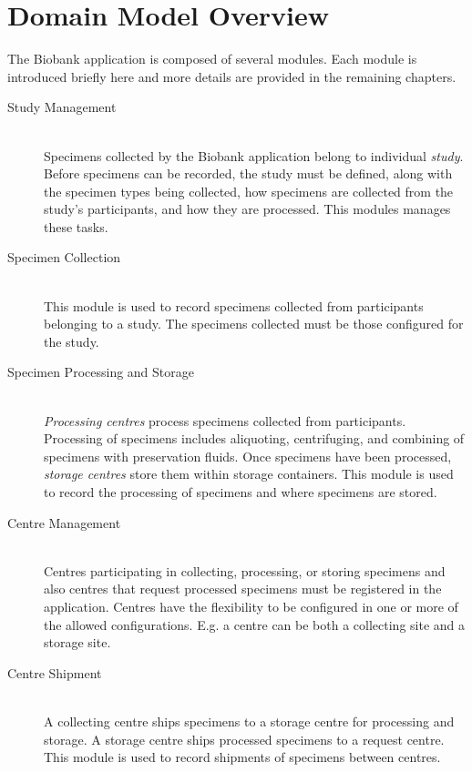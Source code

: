 \chapter{Domain Model Overview}

The Biobank application is composed of several modules. Each module is
introduced briefly here and more details are provided in the remaining
chapters.

\begin{description}

\item[Study Management] \hfill \\ Specimens collected by the Biobank
  application belong to individual \emph{study}. Before specimens can be
  recorded, the study must be defined, along with the specimen types being
  collected, how specimens are collected from the study's participants, and how
  they are processed. This modules manages these tasks.

\item[Specimen Collection] \hfill \\ This module is used to record
  specimens collected from participants belonging to a study. The specimens
  collected must be those configured for the study.

\item[Specimen Processing and Storage] \hfill \\ \emph{Processing centres}
  process specimens collected from participants. Processing of specimens
  includes aliquoting, centrifuging, and combining of specimens with
  preservation fluids.  Once specimens have been processed, \emph{storage
    centres} store them within storage containers. This module is used to
  record the processing of specimens and where specimens are stored.

\item[Centre Management] \hfill \\ Centres participating in collecting,
  processing, or storing specimens and also centres that request processed
  specimens must be registered in the application. Centres have the
  flexibility to be configured in one or more of the allowed
  configurations. E.g. a centre can be both a collecting site and a storage
  site.

\item[Centre Shipment] \hfill \\ A collecting centre ships specimens to a
  storage centre for processing and storage. A storage centre ships processed
  specimens to a request centre. This module is used to record shipments of
  specimens between centres.


\end{description}
